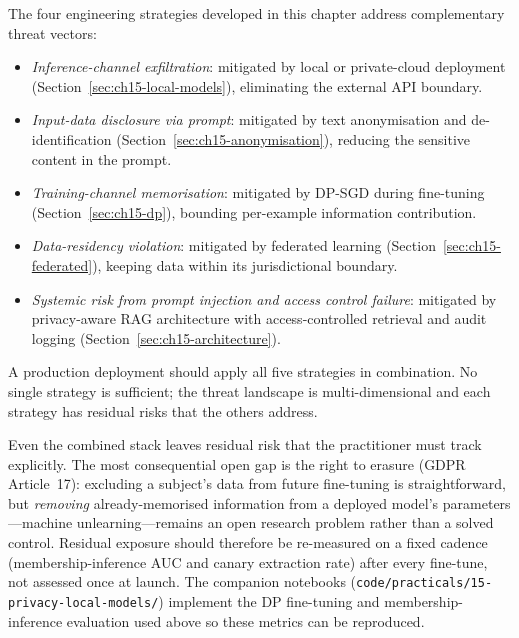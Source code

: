 \begin{remark}
\label{rem:ch15-summary}
The four engineering strategies developed in this chapter address complementary threat vectors:
\begin{itemize}
  \item \emph{Inference-channel exfiltration}: mitigated by local or private-cloud deployment (Section~\ref{sec:ch15-local-models}), eliminating the external API boundary.
  \item \emph{Input-data disclosure via prompt}: mitigated by text anonymisation and de-identification (Section~\ref{sec:ch15-anonymisation}), reducing the sensitive content in the prompt.
  \item \emph{Training-channel memorisation}: mitigated by DP-SGD during fine-tuning (Section~\ref{sec:ch15-dp}), bounding per-example information contribution.
  \item \emph{Data-residency violation}: mitigated by federated learning (Section~\ref{sec:ch15-federated}), keeping data within its jurisdictional boundary.
  \item \emph{Systemic risk from prompt injection and access control failure}: mitigated by privacy-aware RAG architecture with access-controlled retrieval and audit logging (Section~\ref{sec:ch15-architecture}).
\end{itemize}
A production deployment should apply all five strategies in combination. No single strategy is sufficient; the threat landscape is multi-dimensional and each strategy has residual risks that the others address.
\end{remark}

Even the combined stack leaves residual risk that the practitioner must track explicitly.
The most consequential open gap is the right to erasure (GDPR Article~17): excluding a
subject's data from future fine-tuning is straightforward, but \emph{removing} already-memorised
information from a deployed model's parameters---machine unlearning---remains an open research
problem rather than a solved control. Residual exposure should therefore be re-measured on a
fixed cadence (membership-inference AUC and canary extraction rate) after every fine-tune, not
assessed once at launch. The companion notebooks
(\texttt{code/practicals/15-privacy-local-models/}) implement the DP fine-tuning and
membership-inference evaluation used above so these metrics can be reproduced.
